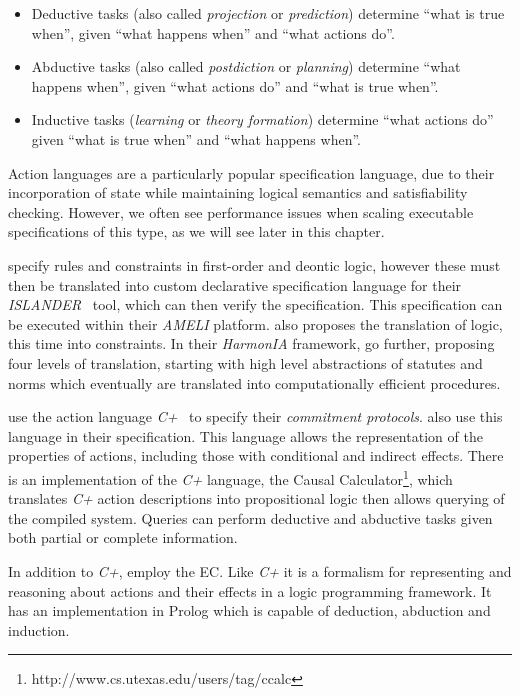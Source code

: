 \begin{itemize}
\item Deductive tasks (also called \emph{projection} or
\emph{prediction}) determine ``what is true when'', given ``what happens
when'' and ``what actions do''. 
\item Abductive tasks (also called
\emph{postdiction} or \emph{planning}) determine ``what happens when'', given
``what actions do'' and ``what is true when''. 
\item Inductive tasks
(\emph{learning} or \emph{theory formation}) determine ``what actions do''
given ``what is true when'' and ``what happens when''. 
\end{itemize}

Action languages are a
particularly popular specification language, due to their incorporation of
state while maintaining logical semantics and satisfiability checking.
However, we often see performance issues when scaling executable
specifications of this type, as we will see later in this chapter.

\citet{Arcos2005} specify rules and constraints in first-order and deontic
logic, however these must then be translated into custom declarative
specification language for their \emph{ISLANDER}~\citep{Esteva2002} tool,
which can then verify the specification. This specification can be executed
within their \emph{AMELI} platform. \citet{Aldewereld2006} also proposes the
translation of logic, this time into constraints. In their \emph{HarmonIA}
framework, \citet{Vazquez-Salceda2003} go further, proposing four levels of
translation, starting with high level abstractions of statutes and norms which
eventually are translated into computationally efficient procedures.

\citet{Chopra2006} use the action language \emph{C+}~\citep{Giunchiglia2004}
to specify their \emph{commitment protocols}. \citet{Artikis2009} also use this
language in their specification. This language allows the representation of
the properties of actions, including those with conditional and indirect
effects. There is an implementation of the \emph{C+} language, the Causal
Calculator\footnote{http://www.cs.utexas.edu/users/tag/ccalc}, which
translates \emph{C+} action descriptions into propositional logic then allows
querying of the compiled system. Queries can perform deductive and abductive
tasks given both partial or complete information.

In addition to \emph{C+}, \citet{Artikis2009} employ the \ac{EC}. Like
\emph{C+} it is a formalism for representing and reasoning about actions and
their effects in a logic programming framework. It has an implementation in
Prolog which is capable of deduction, abduction and induction.

